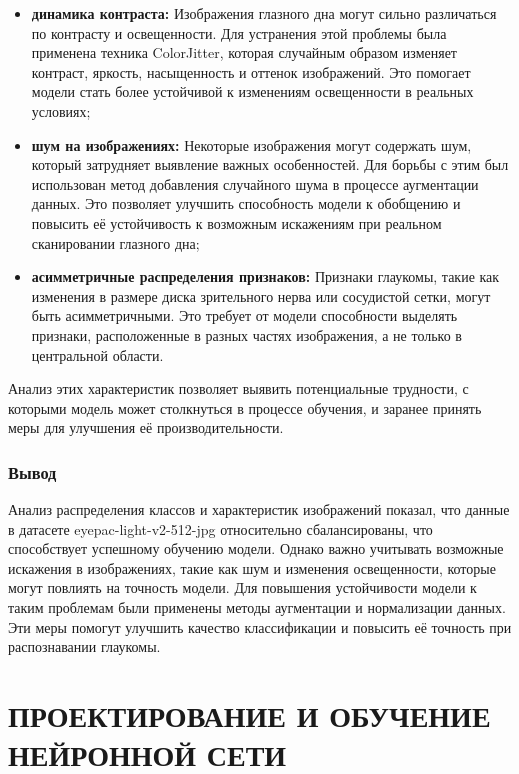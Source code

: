 {\begin{itemize}
        \item \textbf{динамика контраста:} Изображения глазного дна могут сильно различаться по контрасту и освещенности. Для устранения этой проблемы была применена техника ColorJitter, которая случайным образом изменяет контраст, яркость, насыщенность и оттенок изображений. Это помогает модели стать более устойчивой к изменениям освещенности в реальных условиях;

        \item \textbf{шум на изображениях:} Некоторые изображения могут содержать шум, который затрудняет выявление важных особенностей. Для борьбы с этим был использован метод добавления случайного шума в процессе аугментации данных. Это позволяет улучшить способность модели к обобщению и повысить её устойчивость к возможным искажениям при реальном сканировании глазного дна;
        
        \item \textbf{асимметричные распределения признаков:} Признаки глаукомы, такие как изменения в размере диска зрительного нерва или сосудистой сетки, могут быть асимметричными. Это требует от модели способности выделять признаки, расположенные в разных частях изображения, а не только в центральной области.
    \end{itemize}

    Анализ этих характеристик позволяет выявить потенциальные трудности, с которыми модель может столкнуться в процессе обучения, и заранее принять меры для улучшения её производительности.

    \subsubsection*{Вывод}

    Анализ распределения классов и характеристик изображений показал, что данные в датасете eyepac-light-v2-512-jpg относительно сбалансированы, что способствует успешному обучению модели. Однако важно учитывать возможные искажения в изображениях, такие как шум и изменения освещенности, которые могут повлиять на точность модели. Для повышения устойчивости модели к таким проблемам были применены методы аугментации и нормализации данных. Эти меры помогут улучшить качество классификации и повысить её точность при распознавании глаукомы.

\newpage
\section{ПРОЕКТИРОВАНИЕ И ОБУЧЕНИЕ НЕЙРОННОЙ СЕТИ}

}
